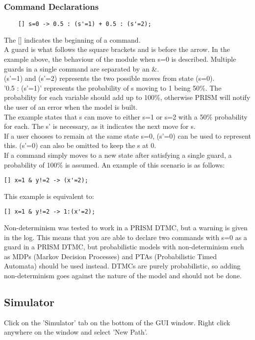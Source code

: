 \documentclass[a4paper]{article}
\begin{document}
\subsubsection{Command Declarations}
\begin{lstlisting}
	[] s=0 -> 0.5 : (s'=1) + 0.5 : (s'=2);
\end{lstlisting}
\medskip
The [] indicates the beginning of a command. 
\\[1\baselineskip]
A guard is what follows the square brackets and is before the arrow. In the example above, the behaviour of the module when s=0 is described. Multiple guards in a single command are separated by an \&. 
\\[1\baselineskip]
(s'=1) and (s'=2) represents the two possible moves from state (s=0). 
\\[1\baselineskip]
'0.5 : (s'=1)' represents the probability of s moving to 1 being 50\%. The probability for each variable should add up to 100\%, otherwise PRISM will notify the user of an error when the model is built.
\\[1\baselineskip]
The example states that s can move to either s=1 or s=2 with a 50\% probability for each. The s' is necessary, as it indicates the next move for s. 
\\[1\baselineskip]
If a user chooses to remain at the same state s=0, (s'=0) can be used to represent this. (s'=0) can also be omitted to keep the s at 0. 
\\[1\baselineskip]
If a command simply moves to a new state after satisfying a single guard, a probability of 100\% is assumed. An example of this scenario is as follows:
\begin{lstlisting}
[] x=1 & y!=2 -> (x'=2); 
\end{lstlisting}
This example is equivalent to:
\begin{lstlisting}
[] x=1 & y!=2 -> 1:(x'=2); 
\end{lstlisting}
Non-determinism was tested to work in a PRISM DTMC, but a warning is given in the log. This means that you are able to declare two commands with s=0 as a guard in a PRISM DTMC, but probabilistic models with non-determinism such as MDPs (Markov Decision Processes) and PTAs (Probabilistic Timed Automata) should be used instead. DTMCs are purely probabilistic, so adding non-determinism goes against the nature of the model and should not be done.  

\subsection{Simulator}
Click on the 'Simulator' tab on the bottom of the GUI window. Right click anywhere on the window and select 'New Path'.
\end{document}
